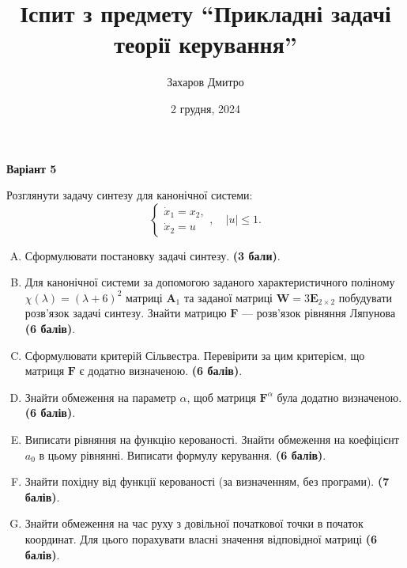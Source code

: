 \documentclass{hw_template}
\title{\huge\bfseries Іспит з предмету ``Прикладні задачі теорії керування''}
\author{\Large Захаров Дмитро}
\date{2 грудня, 2024}
\begin{document}
\pagestyle{fancy}

\maketitle
\begin{center}
    \textbf{Варіант 5}
\end{center}

\begin{problems}
    Розглянути задачу синтезу для канонічної системи:
    \begin{equation*}
        \begin{cases}
            \dot{x}_1 = x_2, \\
            \dot{x}_2 = u
        \end{cases}, \quad |u| \leq 1.
    \end{equation*}

    \begin{enumerate}[(A)]
        \item Сформулювати постановку задачі синтезу. \textbf{(3 бали)}.
        \item Для канонічної системи за допомогою заданого характеристичного поліному
        $\chi(\lambda) = (\lambda+6)^2$ матриці $\boldsymbol{A}_1$ та заданої
        матриці $\boldsymbol{W}=3\boldsymbol{E}_{2 \times 2}$ побудувати розв'язок
        задачі синтезу. Знайти матрицю $\boldsymbol{F}$ --- розв'язок рівняння
        Ляпунова \textbf{(6 балів)}.
        \item Сформулювати критерій Сільвестра. Перевірити за цим критерієм, що матриця
        $\boldsymbol{F}$ є додатно визначеною. \textbf{(6 балів)}.
        \item Знайти обмеження на параметр $\alpha$, щоб матриця $\boldsymbol{F}^{\alpha}$ була 
        додатно визначеною. \textbf{(6 балів)}.
        \item Виписати рівняння на функцію керованості. Знайти обмеження на коефіцієнт $a_0$ в цьому рівнянні. Виписати 
        формулу керування. \textbf{(6 балів)}.
        \item Знайти похідну від функції керованості (за визначенням, без програми). \textbf{(7 балів)}.
        \item Знайти обмеження на час руху з довільної початкової точки в початок
        координат. Для цього порахувати власні значення відповідної матриці \textbf{(6
        балів)}.
    \end{enumerate}
\end{problems}
\end{document}
